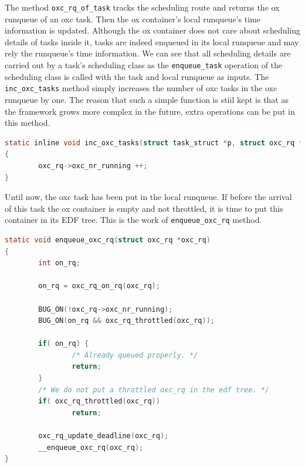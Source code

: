 The method \texttt{oxc\_rq\_of\_task} tracks the scheduling route and 
returns the ox runqueue of an oxc task. Then the ox container's local 
runqueue's time information is updated. Although the ox container does 
not care about scheduling details of tasks inside it, tasks are indeed 
enqueued in its local runqueue and may rely the runqueue's time information. 
We can see that all scheduling details are carried out by a task's 
scheduling class as the \texttt{enqueue\_task} operation of the 
scheduling class is called with the task and local runqueue as inputs. 
The \texttt{inc\_oxc\_tasks} method simply increases the number of oxc 
tasks in the oxc runqueue by one. The reason that such a simple function 
is stiil kept is that as the framework grows more complex in the future, 
extra operations can be put in this method.

\begin{lstlisting}[language=C, 
		caption={To update the number of tasks inside a container} ]
static inline void inc_oxc_tasks(struct task_struct *p, struct oxc_rq *oxc_rq)
{
        oxc_rq->oxc_nr_running ++;
}
\end{lstlisting}

Until now, the oxc task has been put in the local runqueue. 
If before the arrival of this task the ox container is empty and not 
throttled, it is time to put this container in its EDF tree.
This is the work of \texttt{enqueue\_oxc\_rq} method. 

\begin{lstlisting}[language=C, 
		caption={To put an ox container in the EDF tree
					if necessary}]
static void enqueue_oxc_rq(struct oxc_rq *oxc_rq)
{
        int on_rq;

        on_rq = oxc_rq_on_rq(oxc_rq);

        BUG_ON(!oxc_rq->oxc_nr_running);
        BUG_ON(on_rq && oxc_rq_throttled(oxc_rq));

        if( on_rq) {
                /* Already queued properly. */
                return;
        }
        /* We do not put a throttled oxc_rq in the edf tree. */
        if( oxc_rq_throttled(oxc_rq))
                return;

        oxc_rq_update_deadline(oxc_rq);
        __enqueue_oxc_rq(oxc_rq);
}
\end{lstlisting}

